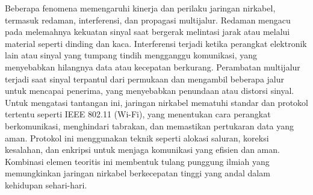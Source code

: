 Beberapa fenomena memengaruhi kinerja dan perilaku jaringan 
nirkabel, termasuk redaman, interferensi, dan propagasi 
multijalur. Redaman mengacu pada melemahnya kekuatan sinyal saat 
bergerak melintasi jarak atau melalui material seperti dinding 
dan kaca. Interferensi terjadi ketika perangkat elektronik lain 
atau sinyal yang tumpang tindih mengganggu komunikasi, yang 
menyebabkan hilangnya data atau kecepatan berkurang. Perambatan 
multijalur terjadi saat sinyal terpantul dari permukaan dan 
mengambil beberapa jalur untuk mencapai penerima, yang 
menyebabkan penundaan atau distorsi sinyal. Untuk mengatasi 
tantangan ini, jaringan nirkabel mematuhi standar dan protokol 
tertentu seperti IEEE 802.11 (Wi-Fi), yang menentukan cara 
perangkat berkomunikasi, menghindari tabrakan, dan memastikan 
pertukaran data yang aman. Protokol ini menggunakan teknik 
seperti alokasi saluran, koreksi kesalahan, dan enkripsi untuk 
menjaga komunikasi yang efisien dan aman. Kombinasi elemen 
teoritis ini membentuk tulang punggung ilmiah yang memungkinkan 
jaringan nirkabel berkecepatan tinggi yang andal dalam kehidupan 
sehari-hari.
